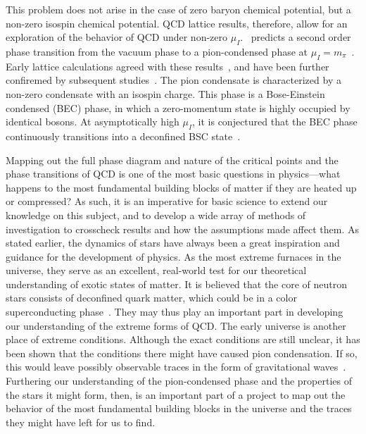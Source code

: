 This problem does not arise in the case of zero baryon chemical potential, but a non-zero isospin chemical potential.
QCD lattice results, therefore, allow for an exploration of the behavior of QCD under non-zero $\mu_I$.
\chpt\, predicts a second order phase transition from the vacuum phase to a pion-condensed phase at $\mu_I = m_\pi$~\autocite{sonQCDFiniteIsospin2001}.
Early lattice calculations agreed with these results~\autocite{kogutQuenchedLatticeQCD2002,kogutLatticeQCDFinite2002,kogutFiniteTemperatureTransition2004,sinclairSearchingElusiveCritical2006}, 
and have been further confiremed by subsequent studies~\autocite{brandtNewClassCompact2018,brandtQCDFiniteIsospin2018,brandtQCDPhaseDiagram2018,brandtReliabilityTaylorExpansions2019,brandtQCDPhaseDiagram2017}.
The pion condensate is characterized by a non-zero condensate with an isospin charge.
This phase is a Bose-Einstein condensed (BEC) phase, in which a zero-momentum state is highly occupied by identical bosons.
At asymptotically high $\mu_I$, it is conjectured that the BEC phase continuously transitions into a deconfined BSC state~\autocite{sonQCDFiniteIsospin2001a,sonQCDFiniteIsospin2001}.




Mapping out the full phase diagram and nature of the critical points and the phase transitions of QCD is one of the most basic questions in physics---what happens to the most fundamental building blocks of matter if they are heated up or compressed?
As such, it is an imperative for basic science to extend our knowledge on this subject, and to develop a wide array of methods of investigation to crosscheck results and how the assumptions made affect them.
As stated earlier, the dynamics of stars have always been a great inspiration and guidance for the development of physics.
As the most extreme furnaces in the universe, they serve as an excellent, real-world test for our theoretical understanding of exotic states of matter.
It is believed that the core of neutron stars consists of deconfined quark matter, which could be in a color superconducting phase~\autocite{baymHadronsQuarksNeutron2018,alfordColorSuperconductivityDense2008}.
They may thus play an important part in developing our understanding of the extreme forms of QCD.
The early universe is another place of extreme conditions.
Although the exact conditions are still unclear, it has been shown that the conditions there might have caused pion condensation.
If so, this would leave possibly observable traces in the form of gravitational waves~\autocite{hajkarimEffectsQCDEquation2019,wygasCosmicQCDEpoch2018,vovchenkoPionCondensationEarly2021}.
Furthering our understanding of the pion-condensed phase and the properties of the stars it might form, then, is an important part of a project to map out the behavior of the most fundamental building blocks in the universe and the traces they might have left for us to find.




